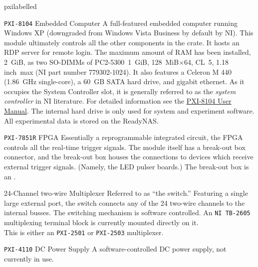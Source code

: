 \newcommand*{\pxilabelled}[1]{\hspace\labelsep \normalfont\bfseries #1}
\begin{labelled}{pxilabelled}

  \item[\pxislotone{} \texttt{PXI-8104}\hspace{.25em} Embedded Computer]
    A full-featured embedded computer running Windows XP (downgraded from Windows Vista Business by default by \gls{NI}).  This module ultimately controls all the other components in the crate.  It hosts an RDP server for remote login.  The maximum amount of RAM has been installed, 2~GiB, as two SO-DIMMs of PC2-5300~1~GiB, 128~MiB$\times$64, CL~5, 1.18\,inch~max (\gls{NI} part number 779302-1024).  It also features a Celeron M 440 (1.86~GHz single-core), a 60~GB SATA hard drive, and gigabit ethernet.  As it occupies the \gls{System Controller} slot, it is generally referred to as the \textit{system controller} in \gls{NI} literature.  For detailed information see the \href{National Instruments Manuals/NI PXI-8104 User Manual}{PXI-8104 User Manual}.  The internal hard drive is only used for system and experiment software.  All experimental data is stored on the \gls{ReadyNAS}.  

  \item[\pxislottwo{} \texttt{PXI-7851R}\hspace{.25em} \gls{FPGA}]
    Essentially a reprogrammable integrated circuit, the FPGA controls all the real-time trigger signals.  The module itself has a break-out box connector, and the break-out box houses the connections to devices which receive external trigger signals.  (Namely, the LED pulser boards.)  The break-out box is an .

  \item[\pxislotn{3} \texttt{\FIXME}\hspace{.25em} 24-Channel two-wire Multiplexer]
    Referred to as ``the switch.''  Featuring a single large external port, the switch connects any of the 24 two-wire channels to the internal busses.  The switching mechanism is software controlled.  An \texttt{NI TB-2605} multiplexing terminal block is currently mounted directly on it.\\\noindent
    \FIXME This is either an \texttt{PXI-2501} or \texttt{PXI-2503} multiplexer.

  \item[\pxislotn{4} \texttt{PXI-4110}\hspace{.25em} DC Power Supply]
    A software-controlled DC power supply, not currently in use.


\end{labelled}
